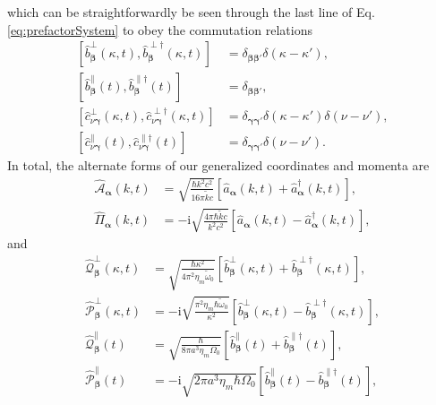 \documentclass{article}
\begin{document}
which can be straightforwardly be seen through the last line of Eq. \eqref{eq:prefactorSystem} to obey the commutation relations
\begin{equation}
\begin{split}
\left[\hat{b}_{\bm{\beta}}^\perp(\kappa,t),\hat{b}_{\bm{\beta}}^{\perp\dagger}(\kappa,t)\right] &= \delta_{\bm{\beta}\bm{\beta}'}\delta(\kappa - \kappa'),\\
\left[\hat{b}_{\bm{\beta}}^\parallel(t),\hat{b}_{\bm{\beta}}^{\parallel\dagger}(t)\right] &= \delta_{\bm{\beta}\bm{\beta}'},\\
\left[\hat{c}_{\nu\bm{\gamma}}^\perp(\kappa,t),\hat{c}_{\nu\bm{\gamma}}^{\perp\dagger}(\kappa,t)\right] &= \delta_{\bm{\gamma}\bm{\gamma}'}\delta(\kappa - \kappa')\delta(\nu - \nu'),\\
\left[\hat{c}_{\nu\bm{\gamma}}^\parallel(t),\hat{c}_{\nu\bm{\gamma}}^{\parallel\dagger}(t)\right] &= \delta_{\bm{\gamma}\bm{\gamma}'}\delta(\nu - \nu').
\end{split}
\end{equation}
In total, the alternate forms of our generalized coordinates and momenta are
\begin{equation}
\begin{split}
\hat{\mathcal{A}}_{\bm{\alpha}}(k,t) &= \sqrt{\frac{\hbar k^2c^2}{16\pi\tilde{k}c}}\left[\hat{a}_{\bm{\alpha}}(k,t) + \hat{a}^\dagger_{\bm{\alpha}}(k,t)\right],\\
\hat{\mathit{\Pi}}_{\bm{\alpha}}(k,t) &= -\mathrm{i}\sqrt{\frac{4\pi\hbar\tilde{k}c}{k^2c^2}}\left[\hat{a}_{\bm{\alpha}}(k,t) - \hat{a}_{\bm{\alpha}}^\dagger(k,t)\right],
\end{split}
\end{equation}
and
\begin{equation}
\begin{split}
\hat{\mathcal{Q}}_{\bm{\beta}}^\perp(\kappa,t) &= \sqrt{\frac{\hbar\kappa^2}{4\pi^2\eta_m\tilde{\omega}_0}}\left[\hat{b}_{\bm{\beta}}^\perp(\kappa,t) + \hat{b}_{\bm{\beta}}^{\perp\dagger}(\kappa,t)\right],\\
\hat{\mathcal{P}}_{\bm{\beta}}^\perp(\kappa,t) &= -\mathrm{i}\sqrt{\frac{\pi^2\eta_m\hbar\tilde{\omega}_0}{\kappa^2}}\left[\hat{b}_{\bm{\beta}}^\perp(\kappa,t) - \hat{b}_{\bm{\beta}}^{\perp\dagger}(\kappa,t)\right],\\[0.5em]
\hat{\mathcal{Q}}_{\bm{\beta}}^\parallel(t) &= \sqrt{\frac{\hbar}{8\pi a^3\eta_m\Omega_0}}\left[\hat{b}_{\bm{\beta}}^\parallel(t) + \hat{b}_{\bm{\beta}}^{\parallel\dagger}(t)\right],\\
\hat{\mathcal{P}}_{\bm{\beta}}^\parallel(t) &= -\mathrm{i}\sqrt{2\pi a^3\eta_m\hbar\Omega_0}\left[\hat{b}_{\bm{\beta}}^\parallel(t) - \hat{b}_{\bm{\beta}}^{\parallel\dagger}(t)\right],
\end{split}
\end{equation}
\end{document}

